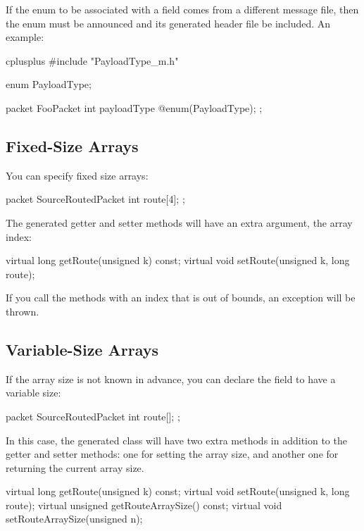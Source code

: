 If the enum to be associated with a field comes from a different message file,
then the enum must be announced and its generated header file be included.
An example:

\begin{msg}
cplusplus {{
#include "PayloadType_m.h"
}}

enum PayloadType;

packet FooPacket
{
    int payloadType @enum(PayloadType);
};
\end{msg}



\subsection{Fixed-Size Arrays}
\label{sec:msg-defs:fixed-size-arrays}

You can specify fixed size arrays:

\begin{msg}
packet SourceRoutedPacket
{
    int route[4];
};
\end{msg}

The generated getter and setter methods will have an extra  argument,
the array index:

\begin{cpp}
virtual long getRoute(unsigned k) const;
virtual void setRoute(unsigned k, long route);
\end{cpp}

If you call the methods with an index that is out of bounds, an exception
will be thrown.


\subsection{Variable-Size Arrays}
\label{sec:msg-defs:variable-size-arrays}

If the array size is not known in advance, you can declare the field
to have a variable size:

\begin{msg}
packet SourceRoutedPacket
{
    int route[];
};
\end{msg}

In this case, the generated class will have two extra methods in addition
to the getter and setter methods: one for setting the array size, and another
one for returning the current array size.

\begin{cpp}
virtual long getRoute(unsigned k) const;
virtual void setRoute(unsigned k, long route);
virtual unsigned getRouteArraySize() const;
virtual void setRouteArraySize(unsigned n);
\end{cpp}

